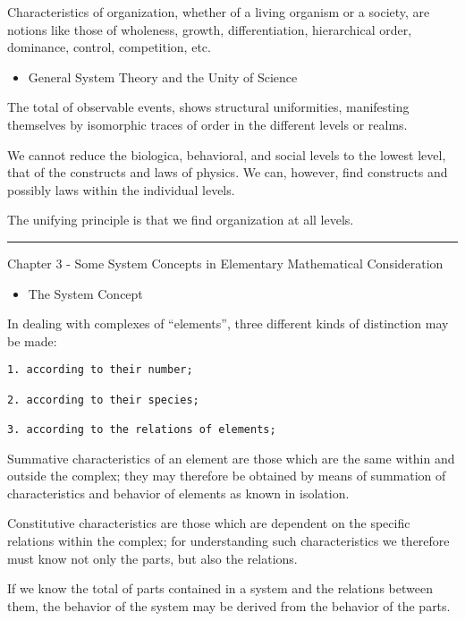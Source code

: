\documentclass[
]{book}
\providecommand{\tightlist}{%
  \setlength{\itemsep}{0pt}\setlength{\parskip}{0pt}}
\begin{document}
Characteristics of organization, whether of a living organism or a society, are notions like those of wholeness, growth, differentiation, hierarchical order, dominance, control, competition, etc.

\begin{itemize}
\tightlist
\item
  General System Theory and the Unity of Science
\end{itemize}

The total of observable events, shows structural uniformities, manifesting themselves by isomorphic traces of order in the different levels or realms.

We cannot reduce the biologica, behavioral, and social levels to the lowest level, that of the constructs and laws of physics. We can, however, find constructs and possibly laws within the individual levels.

The unifying principle is that we find organization at all levels.

\begin{center}\rule{0.5\linewidth}{0.5pt}\end{center}

Chapter 3 - Some System Concepts in Elementary Mathematical Consideration

\begin{itemize}
\tightlist
\item
  The System Concept
\end{itemize}

In dealing with complexes of ``elements'', three different kinds of distinction may be made:

\begin{verbatim}
1. according to their number;

2. according to their species;

3. according to the relations of elements;
\end{verbatim}

Summative characteristics of an element are those which are the same within and outside the complex; they may therefore be obtained by means of summation of characteristics and behavior of elements as known in isolation.

Constitutive characteristics are those which are dependent on the specific relations within the complex; for understanding such characteristics we therefore must know not only the parts, but also the relations.

If we know the total of parts contained in a system and the relations between them, the behavior of the system may be derived from the behavior of the parts.
\end{document}
